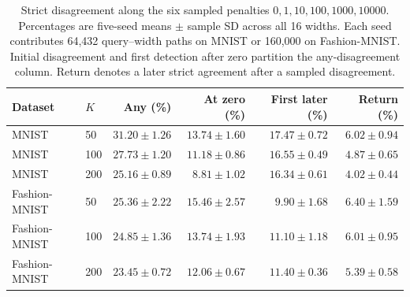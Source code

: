 \begin{table}[!htbp]
\centering\small
\caption{Strict disagreement along the six sampled penalties $0,1,10,100,1000,10000$. Percentages are five-seed means $\pm$ sample SD across all 16 widths. Each seed contributes 64,432 query--width paths on MNIST or 160,000 on Fashion-MNIST. Initial disagreement and first detection after zero partition the any-disagreement column. Return denotes a later strict agreement after a sampled disagreement.}
\label{tab:r4-paths}
\begin{tabular}{@{}llrrrr@{}}
\toprule
Dataset & $K$ & Any (\%) & At zero (\%) & First later (\%) & Return (\%)\\
\midrule
MNIST & 50 & $31.20\pm1.26$ & $13.74\pm1.60$ & $17.47\pm0.72$ & $6.02\pm0.94$\\
MNIST & 100 & $27.73\pm1.20$ & $11.18\pm0.86$ & $16.55\pm0.49$ & $4.87\pm0.65$\\
MNIST & 200 & $25.16\pm0.89$ & $8.81\pm1.02$ & $16.34\pm0.61$ & $4.02\pm0.44$\\
Fashion-MNIST & 50 & $25.36\pm2.22$ & $15.46\pm2.57$ & $9.90\pm1.68$ & $6.40\pm1.59$\\
Fashion-MNIST & 100 & $24.85\pm1.36$ & $13.74\pm1.93$ & $11.10\pm1.18$ & $6.01\pm0.95$\\
Fashion-MNIST & 200 & $23.45\pm0.72$ & $12.06\pm0.67$ & $11.40\pm0.36$ & $5.39\pm0.58$\\
\bottomrule
\end{tabular}
\end{table}

